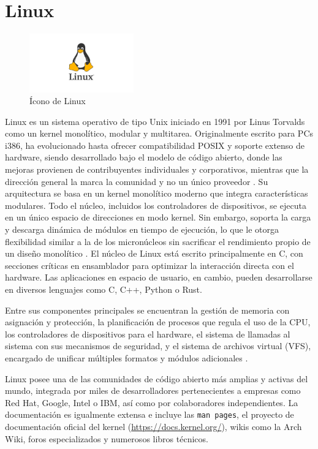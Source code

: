 \section{Linux}

\begin{figure}[H]
    \centering
    \includegraphics[width=0.4\textwidth]{figures/linux.jpeg}
    \caption[Ícono de Linux]%
            {Ícono de Linux \citep{wikipedia5}}
    \label{fig:linux}
\end{figure}

Linux es un sistema operativo de tipo Unix iniciado en 1991 por Linus Torvalds como un kernel monolítico, modular y multitarea.  
Originalmente escrito para PCs i386, ha evolucionado hasta ofrecer compatibilidad POSIX y soporte extenso de hardware, siendo desarrollado bajo el modelo de código abierto, donde las mejoras provienen de contribuyentes individuales y corporativos, mientras que la dirección general la marca la comunidad y no un único proveedor \citep{wikipedia5, oci2024}.  
{\sloppy
Su arquitectura se basa en un kernel monolítico moderno que integra características modulares. Todo el núcleo, incluidos los controladores de dispositivos, se ejecuta en un único espacio de direcciones en modo kernel. Sin embargo, soporta la carga y descarga dinámica de módulos en tiempo de ejecución, lo que le otorga flexibilidad similar a la de los micronúcleos sin sacrificar el rendimiento propio de un diseño monolítico \citep[pp.~7]{love2010}.  
}
El núcleo de Linux está escrito principalmente en C, con secciones críticas en ensamblador para optimizar la interacción directa con el hardware. Las aplicaciones en espacio de usuario, en cambio, pueden desarrollarse en diversos lenguajes como C, C++, Python o Rust.  

Entre sus componentes principales se encuentran la gestión de memoria con asignación y protección, la planificación de procesos que regula el uso de la CPU, los controladores de dispositivos para el hardware, el sistema de llamadas al sistema con sus mecanismos de seguridad, y el sistema de archivos virtual (VFS), encargado de unificar múltiples formatos y módulos adicionales \citep{oci2024}.  

Linux posee una de las comunidades de código abierto más amplias y activas del mundo, integrada por miles de desarrolladores pertenecientes a empresas como Red Hat, Google, Intel o IBM, así como por colaboradores independientes. La documentación es igualmente extensa e incluye las \texttt{man pages}, el proyecto de documentación oficial del kernel (\url{https://docs.kernel.org/}), wikis como la Arch Wiki, foros especializados y numerosos libros técnicos.  
